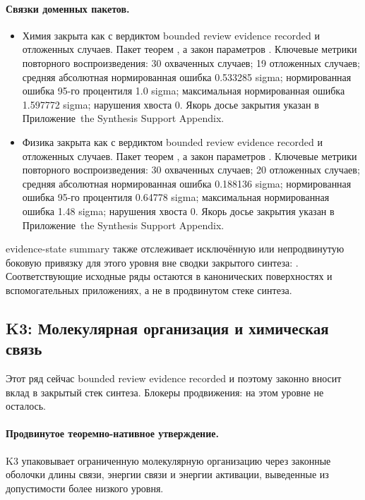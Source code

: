 \paragraph{Связки доменных пакетов.}
\begin{itemize}[leftmargin=1.6em,nosep]
\item Химия закрыта как  с вердиктом bounded review evidence recorded и  отложенных случаев. Пакет теорем , а закон параметров . Ключевые метрики повторного воспроизведения: 30 охваченных случаев; 19 отложенных случаев; средняя абсолютная нормированная ошибка 0.533285 sigma; нормированная ошибка 95-го процентиля 1.0 sigma; максимальная нормированная ошибка 1.597772 sigma; нарушения хвоста 0. Якорь досье закрытия указан в Приложение~the Synthesis Support Appendix.
\item Физика закрыта как  с вердиктом bounded review evidence recorded и  отложенных случаев. Пакет теорем , а закон параметров . Ключевые метрики повторного воспроизведения: 30 охваченных случаев; 20 отложенных случаев; средняя абсолютная нормированная ошибка 0.188136 sigma; нормированная ошибка 95-го процентиля 0.64778 sigma; максимальная нормированная ошибка 1.48 sigma; нарушения хвоста 0. Якорь досье закрытия указан в Приложение~the Synthesis Support Appendix.
\end{itemize}
evidence-state summary также отслеживает  исключённую или непродвинутую боковую привязку для этого уровня вне сводки закрытого синтеза: . Соответствующие исходные ряды остаются в канонических поверхностях и вспомогательных приложениях, а не в продвинутом стеке синтеза.

\subsection{K3: Молекулярная организация и химическая связь}
\label{sec:oc-core-1-3-synthesis-k3}
Этот ряд сейчас bounded review evidence recorded и поэтому законно вносит вклад в закрытый стек синтеза.
Блокеры продвижения: на этом уровне не осталось.

\paragraph{Продвинутое теоремно-нативное утверждение.}
K3 упаковывает ограниченную молекулярную организацию через законные оболочки длины связи, энергии связи и энергии активации, выведенные из допустимости более низкого уровня.

